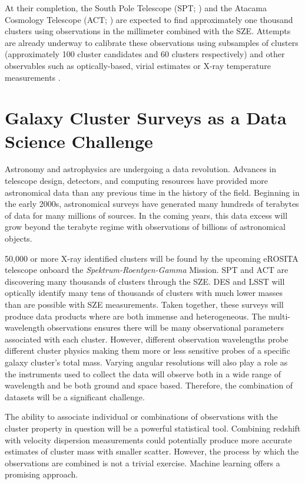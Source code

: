 At their completion, the South Pole Telescope (SPT; \citealt{Carlstrom2011}) and the Atacama Cosmology Telescope (ACT; \citealt{Swetz2011}) are expected to find approximately one thousand clusters using observations in the millimeter combined with the SZE. Attempts are already underway to calibrate these observations using subsamples of clusters (approximately 100 cluster candidates and 60 clusters respectively) and other observables such as optically-based, virial estimates or X-ray temperature measurements . 

\section{Galaxy Cluster Surveys as a Data Science Challenge}
Astronomy and astrophysics are undergoing a data revolution. Advances in telescope design, detectors, and computing resources have provided more astronomical data than any previous time in the history of the field. Beginning in the early 2000s, astronomical surveys have generated many hundreds of terabytes of data for many millions of sources. In the coming years, this data excess will grow beyond the terabyte regime with observations of billions of astronomical objects. 

50,000 or more X-ray identified clusters will be found by the upcoming eROSITA telescope onboard the \emph{Spektrum-Roentgen-Gamma} Mission. SPT and ACT are discovering many thousands of clusters through the SZE. DES and LSST will optically identify many tens of thousands of clusters with much lower masses than are possible with SZE measurements. Taken together, these surveys will produce data products where are both immense and heterogeneous. The multi-wavelength observations ensures there will be many observational parameters associated with each cluster. However, different observation wavelengths probe different cluster physics making them more or less sensitive probes of a specific galaxy cluster's total mass. Varying angular resolutions will also play a role as the instruments used to collect the data will observe both in a wide range of wavelength and be both ground and space based. Therefore, the combination of datasets will be a significant challenge.

The ability to associate individual or combinations of observations with the cluster property in question will be a powerful statistical tool. Combining redshift with velocity dispersion measurements could potentially produce more accurate estimates of cluster mass with smaller scatter. However, the process by which the observations are combined is not a trivial exercise. Machine learning offers a promising approach.

